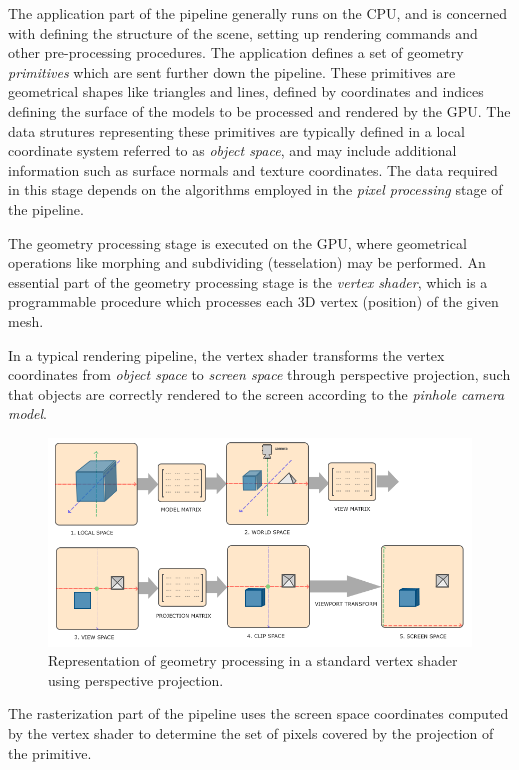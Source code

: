 \documentclass{article}
\begin{document}
The application part of the pipeline generally runs on the CPU, and is concerned with defining the structure of the scene, setting up rendering commands and other pre-processing procedures.
The application defines a set of geometry \textit{primitives} which are sent further down the pipeline. These primitives
are geometrical shapes like triangles and lines, defined by coordinates and indices defining the surface of the models to be processed and rendered by the GPU.
The data strutures representing these primitives are typically defined in a local coordinate system referred to as \textit{object space}, and may include additional information such as surface normals and texture coordinates. The data required
in this stage depends on the algorithms employed in the \textit{pixel processing} stage of the pipeline.

The geometry processing stage is executed on the GPU, where geometrical operations like morphing and subdividing (tesselation) may be performed.
An essential part of the geometry processing stage is the \textit{vertex shader}, which is a programmable procedure which processes each 3D vertex (position) of the given mesh.

In a typical rendering pipeline, the vertex shader transforms the vertex coordinates from \textit{object space} to \textit{screen space} through perspective projection, such that
objects are correctly rendered to the screen according to the \textit{pinhole camera model}.

\begin{figure}[tbh]
    \centering
    \includegraphics[width=1.0\textwidth]{images/coordinate_systems.png}
    \caption{Representation of geometry processing in a standard vertex shader using perspective projection\cite{learnopengl_figure}.}
    \label{fig:graphicsTransformations}
\end{figure}

The rasterization part of the pipeline uses the screen space coordinates computed by the vertex shader to
determine the set of pixels covered by the projection of the primitive. 
\end{document}
